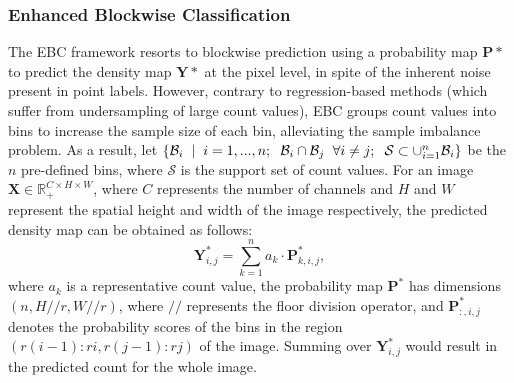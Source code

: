\subsubsection{Enhanced Blockwise Classification}
The EBC framework resorts to blockwise prediction using a probability map $\mathbf{P}*$ to predict the density map $\mathbf{Y}*$ at the pixel level, in spite of the inherent noise present in point labels. However, contrary to regression-based methods (which suffer from undersampling of large count values), EBC groups count values into bins to increase the sample size of each bin, alleviating the sample imbalance problem. As a result, let $\{ \mathcal{B}_i \hspace{2mm} |\hspace{2mm} i=1, ... ,n;\hspace{2mm} \mathcal{B}_i \cap \mathcal{B}_j \hspace{2mm} \forall i \neq j;\hspace{2mm} \mathcal{S} \subset \cup_{i=1}^{n} \mathcal{B}_i \}$ be the $n$ pre-defined bins, where $\mathcal{S}$ is the support set of count values. For an image $\mathbf{X} \in \mathbb{R}_{+}^{C\times H\times W}$, where $C$ represents the number of channels and $H$ and $W$ represent the spatial height and width of the image respectively, the predicted density map can be obtained as follows:
$$ \mathbf{Y}_{i,j}^* = \sum_{k=1}^{n} a_k \cdot \mathbf{P}_{k,i,j}^* , $$ where $a_k$ is a representative count value, the probability map $\mathbf{P}^*$ has dimensions $(n, H//r, W//r)$, where $//$ represents the floor division operator, and $\mathbf{P}_{:,i,j}^*$ denotes the probability scores of the bins in the region $(r(i-1):ri, r(j-1):rj)$ of the image. Summing over $\mathbf{Y}_{i,j}^*$ would result in the predicted count for the whole image.\\


